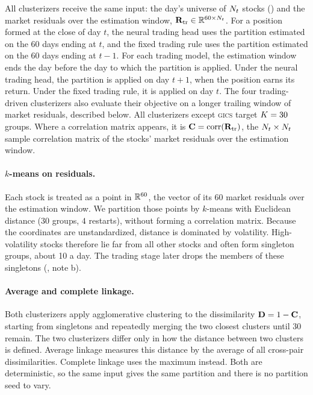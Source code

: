All clusterizers receive the same input: the day's universe of $N_t$ stocks
() and the market residuals over the estimation window,
$\mathbf{R}_{\mathrm{tr}} \in \mathbb{R}^{60 \times N_t}$. For a position formed at the close of day $t$, the neural trading head uses the partition estimated on the 60 days ending at $t$, and the fixed trading rule uses the partition estimated on the 60 days ending at $t-1$. For each trading model, the estimation window ends the day before the day to which the partition is applied. Under the neural trading head, the partition is applied on day $t+1$, when the position earns its return. Under the fixed trading rule, it is applied on day $t$. The four trading-driven clusterizers also evaluate their objective on a longer trailing window of market residuals, described below. All clusterizers except \textsc{gics} target $K = 30$ groups. Where a correlation matrix appears,
it is $\mathbf{C} = \operatorname{corr}(\mathbf{R}_{\mathrm{tr}})$, the
$N_t \times N_t$ sample correlation matrix of the stocks' market residuals over the estimation window.

\paragraph{$k$-means on residuals.} Each stock is treated as a point in
$\mathbb{R}^{60}$, the vector of its 60 market residuals over the estimation window. We partition those points by $k$-means with
Euclidean distance ($30$ groups, $4$
restarts), without forming a correlation matrix. Because the coordinates are
unstandardized, distance is dominated by volatility. High-volatility stocks therefore lie far from all other stocks and often form singleton groups, about 10 a
day. The trading stage later drops the members of these singletons (, note b).

\paragraph{Average and complete linkage.} Both clusterizers apply agglomerative clustering to
the dissimilarity $\mathbf{D} = 1 - \mathbf{C}$, starting from singletons and
repeatedly merging the two closest clusters until 30 remain. The two clusterizers differ only in how the distance between two clusters is defined. Average linkage measures this distance by the
average of all cross-pair dissimilarities. Complete linkage uses the maximum instead. Both are deterministic, so the same input gives the same partition and
there is no partition seed to vary.

